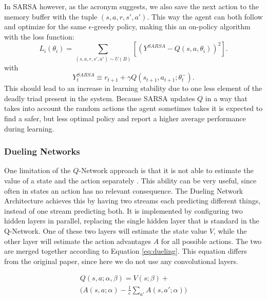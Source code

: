 In SARSA however, as the acronym suggests, we also save the next action to the memory buffer with the tuple $(s,a,r,s',a')$. This way the agent can both follow and optimize for the same $\epsilon$-greedy policy, making this an on-policy algorithm with the loss function:
\begin{equation}
    L_i(\theta_i)= \sum_{(s,a,r,s',a') \sim U(B)}[(Y^{SARSA}-Q(s,a,\theta_i))^2].
\end{equation}
with
\begin{equation}\label{eq:target_sarsa}
    Y^{SARSA}_t \equiv r_{t+1} + \gamma Q(s_{t+1}, a_{t+1}; \theta_t^-).
\end{equation}
This should lead to an increase in learning stability due to one less element of the deadly triad present in the system. Because SARSA updates $Q$ in a way that takes into account the random actions the agent sometimes takes it is expected to find a safer, but less optimal policy \citep{sutton_barto_2018} and report a higher average performance during learning.


\subsubsection{Dueling Networks}\label{sec:dueling}
One limitation of the $Q$-Network approach is that it is not able to estimate the value of a state and the action separately \citep{wang2015dueling}. This ability can be very useful, since often in states an action has no relevant consequence. The Dueling Network Architecture achieves this by having two streams each predicting different things, instead of one stream predicting both. It is implemented by configuring two hidden layers in parallel, replacing the single hidden layer that is standard in the Q-Network. One of these two layers will estimate the state value $V$, while the other layer will estimate the action advantages $A$ for all possible actions. The two are merged together according to Equation \eqref{eq:dueling}. This equation differs from the original paper, since here we do not use any convolutional layers.

\begin{equation} \label{eq:dueling}
  \begin{array}{l}
    Q(s,a; \alpha, \beta) = V(s; \beta) + \\ 
    \Big(A(s, a; \alpha) - \frac{1}{c} \sum\limits_{a'} A(s,a'; \alpha)\Big)
  \end{array}
\end{equation}

